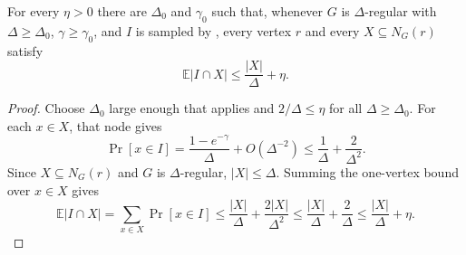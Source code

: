 \begin{lemma}
For every $\eta>0$ there are $\Delta_0$ and $\gamma_0$ such that, whenever
$G$ is $\Delta$-regular with $\Delta\ge\Delta_0$, $\gamma\ge\gamma_0$, and
$I$ is sampled by , every vertex $r$
and every $X\subseteq N_G(r)$ satisfy
\[
\mathbb E|I\cap X|\le \frac{|X|}{\Delta}+\eta .
\]
\end{lemma}
\begin{proof}
Choose $\Delta_0$ large enough that 
applies and $2/\Delta\le\eta$ for all $\Delta\ge\Delta_0$.  For each
$x\in X$, that node gives
\[
\Pr[x\in I]=\frac{1-e^{-\gamma}}{\Delta}+O(\Delta^{-2})
\le \frac1\Delta+\frac{2}{\Delta^2}.
\]
Since $X\subseteq N_G(r)$ and $G$ is $\Delta$-regular, $|X|\le\Delta$.
Summing the one-vertex bound over $x\in X$ gives
\[
\mathbb E|I\cap X|
=\sum_{x\in X}\Pr[x\in I]
\le \frac{|X|}{\Delta}+\frac{2|X|}{\Delta^2}
\le \frac{|X|}{\Delta}+\frac2\Delta
\le \frac{|X|}{\Delta}+\eta .
\]
\end{proof}
